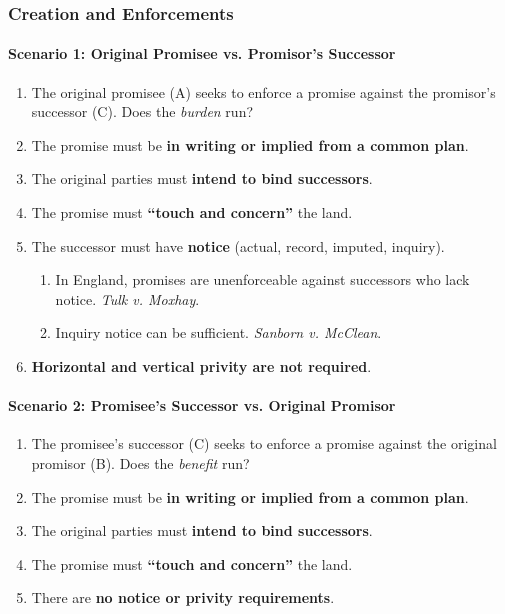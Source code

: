 \subsubsection{Creation and Enforcements}

\paragraph{Scenario 1: Original Promisee vs. Promisor's Successor}

\begin{enumerate}
    \item The original promisee (A) seeks to enforce a promise against the 
    promisor's  successor (C). Does the \emph{burden} run?
    \item The promise must be \textbf{in writing or implied from a common 
    plan}.
    \item The original parties must \textbf{intend to bind successors}.
    \item The promise must \textbf{``touch and concern''} the land.
    \item The successor must have \textbf{notice} (actual, record, imputed, 
    inquiry).
    \begin{enumerate}
        \item In England, promises are unenforceable against successors who 
        lack notice. \emph{Tulk v. Moxhay}.
        \item Inquiry notice can be sufficient. \emph{Sanborn v. McClean}.
    \end{enumerate}
    \item \textbf{Horizontal and vertical privity are not required}.
\end{enumerate}

\paragraph{Scenario 2: Promisee's Successor vs. Original Promisor}

\begin{enumerate}
    \item The promisee's successor (C) seeks to enforce a promise against the 
    original promisor (B). Does the \emph{benefit} run?
    \item The promise must be \textbf{in writing or implied from a common 
    plan}.
    \item The original parties must \textbf{intend to bind successors}.
    \item The promise must \textbf{``touch and concern''} the land.
    \item There are \textbf{no notice or privity requirements}.
\end{enumerate}

